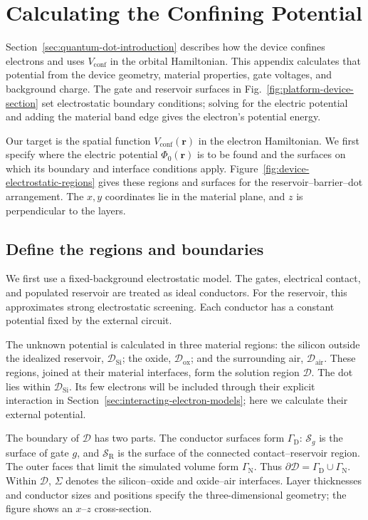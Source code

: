 \FloatBarrier
\section{Calculating the Confining Potential}
\label{app:device-confinement}
\label{chap:device-models}
\label{sec:device-electrostatics}

Section~\ref{sec:quantum-dot-introduction} describes how the device
confines electrons and uses $V_{\mathrm{conf}}$ in the orbital
Hamiltonian. This appendix calculates that potential from the device
geometry, material properties, gate voltages, and background charge.
The gate and reservoir surfaces in
Fig.~\ref{fig:platform-device-section} set electrostatic boundary
conditions; solving for the electric potential and adding the material
band edge gives the electron's potential energy.


Our target is the spatial function $V_{\mathrm{conf}}(\mathbf r)$
in the electron Hamiltonian. We first specify where the electric
potential $\Phi_0(\mathbf r)$ is to be found and the surfaces on
which its boundary and interface conditions apply.
Figure~\ref{fig:device-electrostatic-regions} gives these regions
and surfaces for the reservoir--barrier--dot arrangement.
The $x,y$ coordinates lie in the material plane, and $z$ is
perpendicular to the layers.

\subsection{Define the regions and boundaries}
We first use a fixed-background electrostatic model. The gates,
electrical contact, and populated reservoir are treated as ideal
conductors. For the reservoir, this approximates strong electrostatic
screening. Each conductor has a constant potential fixed by the
external circuit.

The unknown potential is calculated in three material regions:
the silicon outside the idealized reservoir, $\mathcal D_{\mathrm{Si}}$;
the oxide, $\mathcal D_{\mathrm{ox}}$; and the surrounding air,
$\mathcal D_{\mathrm{air}}$. These regions, joined at their material
interfaces, form the solution region $\mathcal D$. The dot lies
within $\mathcal D_{\mathrm{Si}}$. Its few electrons will be included
through their explicit interaction in
Section~\ref{sec:interacting-electron-models}; here we calculate
their external potential.

The boundary of $\mathcal D$ has two parts. The conductor surfaces
form $\Gamma_{\mathrm D}$: $\mathcal S_g$ is the surface of gate $g$,
and $\mathcal S_{\mathrm R}$ is the surface of the connected
contact--reservoir region. The outer faces that limit the simulated
volume form $\Gamma_{\mathrm N}$. Thus
$\partial\mathcal D=\Gamma_{\mathrm D}\cup\Gamma_{\mathrm N}$.
Within $\mathcal D$, $\Sigma$ denotes the silicon--oxide and
oxide--air interfaces. Layer thicknesses and conductor sizes and
positions specify the three-dimensional geometry; the figure shows
an $x$--$z$ cross-section.

